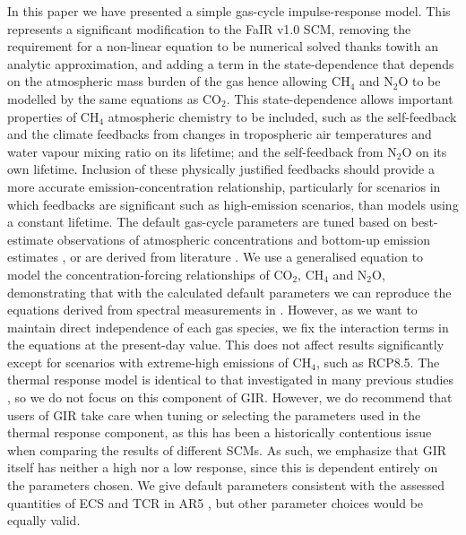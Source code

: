 \documentclass[gmd, manuscript]{copernicus}
\begin{document}
\conclusions  %
In this paper we have presented a simple gas-cycle impulse-response model. This represents a significant modification to the FaIR v1.0 SCM, removing the requirement for a non-linear equation to be numerical solved thanks towith an analytic approximation, and adding a term in the state-dependence that depends on the atmospheric mass burden of the gas hence allowing CH$_4$ and N$_2$O to be modelled by the same equations as CO$_2$. This state-dependence allows important properties of CH$_4$ atmospheric chemistry to be included, such as the self-feedback and the climate feedbacks from changes in tropospheric air temperatures and water vapour mixing ratio on its lifetime; and the self-feedback from N$_2$O on its own lifetime. Inclusion of these physically justified feedbacks should provide a more accurate emission-concentration relationship, particularly for scenarios in which feedbacks are significant such as high-emission scenarios, than models using a constant lifetime. The default gas-cycle parameters are tuned based on best-estimate observations of atmospheric concentrations and bottom-up emission estimates \citep{Meinshausen2017,Gutschow2016}, or are derived from literature \citep{Prather2015,Holmes2013,Joos2013}. We use a generalised equation to model the concentration-forcing relationships of CO$_2$, CH$_4$ and N$_2$O, demonstrating that with the calculated default parameters we can reproduce the equations derived from spectral measurements in \cite{Etminan2016}. However, as we want to maintain direct independence of each gas species, we fix the interaction terms in the \cite{Etminan2016} equations at the present-day value. This does not affect results significantly except for scenarios with extreme-high emissions of CH$_4$, such as RCP8.5. The thermal response model is identical to that investigated in many previous studies \citep{Millar2016,Smith2017,Good2011,Geoffroy2013,Geoffroy2013a,Tsutsui2017}, so we do not focus on this component of GIR. However, we do recommend that users of GIR take care when tuning or selecting the parameters used in the thermal response component, as this has been a historically contentious issue when comparing the results of different SCMs. As such, we emphasize that GIR itself has neither a high nor a low response, since this is dependent entirely on the parameters chosen. We give default parameters consistent with the assessed quantities of ECS and TCR in AR5 \citep{Myhre2013a}, but other parameter choices would be equally valid.\\\\
\end{document}
